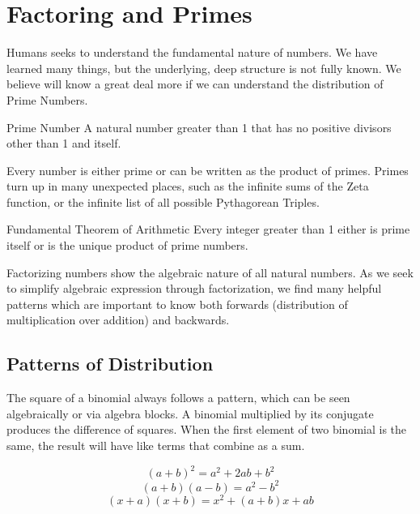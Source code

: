 
\section{Factoring and Primes}\label{sec:primes}
Humans seeks to understand the fundamental nature of numbers.  We have learned
many things, but the underlying, deep structure is not fully known.  We believe will know
a great deal more if we can understand the distribution of Prime Numbers.


\begin{derivation}{Prime Number}
A natural number greater than 1 that has no positive divisors other than 1 and itself.
\end{derivation}


Every number is either prime or can be written as the product of primes.  Primes turn up
in many unexpected places, such as the infinite sums of the Zeta function, or the infinite
list of all possible Pythagorean Triples.  


\begin{derivation}{Fundamental Theorem of Arithmetic}
Every integer greater than 1 either is prime itself or is the unique product of prime numbers.
\end{derivation}


Factorizing numbers show the algebraic nature of all natural numbers.  As we seek 
to simplify algebraic expression through factorization, we find many helpful patterns which 
are important to know both forwards (distribution of multiplication over addition) and 
backwards.

\subsection{Patterns of Distribution}
The square of a binomial always follows a pattern, which can be seen algebraically or
via algebra blocks.  A binomial multiplied by its conjugate produces the difference of squares.
When the first element of two binomial is the same, the result will have like terms that combine
as a sum.

\begin{equation}
(a + b)^2 = a^2 + 2ab + b^2
\end{equation}
\begin{equation}
(a + b) (a - b) = a^2 - b^2
\end{equation}
\begin{equation}
(x + a) (x + b) = x^2 + (a+b)x + ab
\end{equation}

